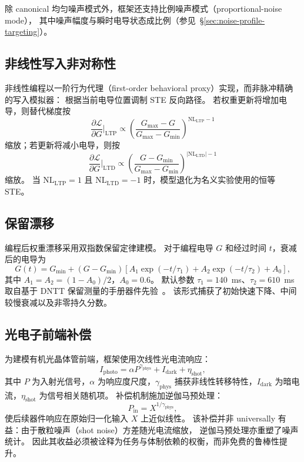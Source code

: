 除 canonical 均匀噪声模式外，框架还支持比例噪声模式（proportional-noise mode），
其中噪声幅度与瞬时电导状态成比例（参见~\S\ref{sec:noise-profile-targeting}）。

\subsection{非线性写入非对称性}

非线性编程以一阶行为代理（first-order behavioral proxy）实现，而非脉冲精确的写入模拟器：
根据当前电导位置调制 STE 反向路径。
若权重更新将增加电导，则替代梯度按
\begin{equation}
\frac{\partial \mathcal{L}}{\partial G}\Big|_{\mathrm{LTP}} \propto \left(\frac{G_{\max}-G}{G_{\max}-G_{\min}}\right)^{\mathrm{NL}_{\mathrm{LTP}}-1}
\label{eq:nl-ltp}
\end{equation}
缩放；若更新将减小电导，则按
\begin{equation}
\frac{\partial \mathcal{L}}{\partial G}\Big|_{\mathrm{LTD}} \propto \left(\frac{G-G_{\min}}{G_{\max}-G_{\min}}\right)^{|\mathrm{NL}_{\mathrm{LTD}}|-1}
\label{eq:nl-ltd}
\end{equation}
缩放。
当 $\mathrm{NL}_{\mathrm{LTP}} = 1$ 且 $\mathrm{NL}_{\mathrm{LTD}} = -1$ 时，模型退化为名义实验使用的恒等 STE。

\subsection{保留漂移}

编程后权重漂移采用双指数保留定律建模。
对于编程电导 $G$ 和经过时间 $t$，衰减后的电导为
\begin{equation}
G(t) = G_{\min} + \left(G - G_{\min}\right) \left[A_1 \exp\left(-t/\tau_1\right) + A_2 \exp\left(-t/\tau_2\right) + A_0\right],
\label{eq:retention}
\end{equation}
其中 $A_1 = A_2 = (1-A_0)/2$，$A_0 = 0.6$。
默认参数 $\tau_1 = 140$~ms、$\tau_2 = 610$~ms 取自基于 DNTT 保留测量的手册器件先验~\citep{vincze2025dualplasticity}。
该形式捕获了初始快速下降、中间较慢衰减以及非零持久分数。

\subsection{光电子前端补偿}

为建模有机光晶体管前端，框架使用次线性光电流响应：
\begin{equation}
I_{\text{photo}} = \alpha P^{\gamma_{\text{phys}}} + I_{\text{dark}} + \eta_{\text{shot}},
\label{eq:photocurrent}
\end{equation}
其中 $P$ 为入射光信号，$\alpha$ 为响应度尺度，$\gamma_{\text{phys}}$ 捕获非线性转移特性，$I_{\text{dark}}$ 为暗电流，$\eta_{\text{shot}}$ 为信号相关随机项。
补偿机制施加逆伽马预处理：
\begin{equation}
P_{\text{in}} = X^{1/\gamma_{\text{phys}}},
\label{eq:inverse-gamma}
\end{equation}
使后续器件响应在原始归一化输入 $X$ 上近似线性。
该补偿并非 universally 有益：由于散粒噪声（shot noise）方差随光电流缩放，
逆伽马预处理亦重塑了噪声统计。
因此其收益必须被诠释为任务与体制依赖的权衡，而非免费的鲁棒性提升。

